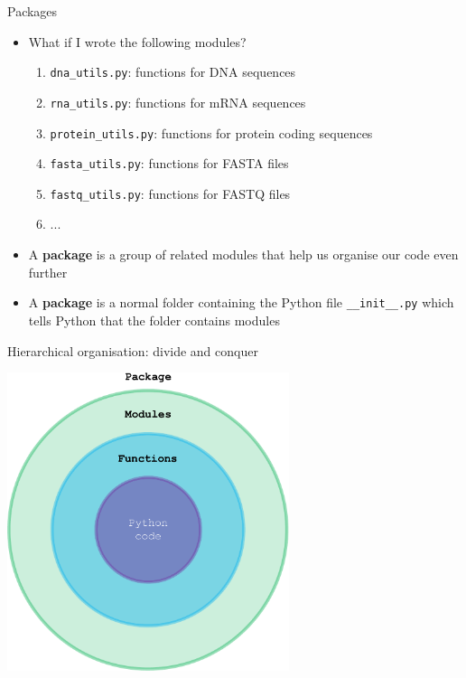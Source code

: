 \documentclass[xcolor=table]{beamer}
\begin{document}
\begin{frame}{Packages}

\begin{itemize}\addtolength{\itemsep}{\baselineskip}
	\item<1-> What if I wrote the following modules?
	\begin{enumerate}
		\item<2-> \texttt{dna\_utils.py}: {\scriptsize functions for DNA sequences}
		\item<3-> \texttt{rna\_utils.py}: {\scriptsize functions for mRNA sequences}
		\item<4-> \texttt{protein\_utils.py}: {\scriptsize functions for protein coding sequences}
		\item<5-> \texttt{fasta\_utils.py}: {\scriptsize functions for FASTA files}
		\item<6-> \texttt{fastq\_utils.py}: {\scriptsize functions for FASTQ files}
		\item<6-> ...
	\end{enumerate}

	\item<7-> A \textbf{package} is a group of related modules that help us organise our code
	even further

	\item<8-> A \textbf{package} is a normal folder containing the Python file \texttt{\_\_init\_\_.py} 
	which tells Python that the folder contains modules  
\end{itemize}

\end{frame}

\begin{frame}{Hierarchical organisation: divide and conquer}

\begin{center}
	\includegraphics[width=0.62\textwidth, keepaspectratio]{package.pdf}
\end{center}

\end{frame}
\end{document}

